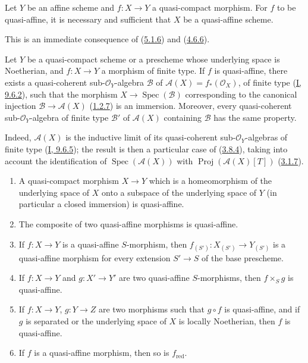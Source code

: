 \begin{corollary}[5.1.8]
\label{II.5.1.8}
Let $Y$ be an affine scheme and $f:X\to Y$ a quasi-compact morphism. For
$f$ to be quasi-affine, it is necessary and sufficient that $X$ be a
quasi-affine scheme.
\end{corollary}

This is an immediate consequence of (\hyperref[II.5.1.6]{5.1.6}) and
(\hyperref[II.4.6.6]{4.6.6}).

\begin{corollary}[5.1.9]
\label{II.5.1.9}
Let $Y$ be a quasi-compact scheme or a prescheme whose underlying space
is Noetherian, and $f:X\to Y$ a morphism of finite type. If $f$ is
quasi-affine, there exists a quasi-coherent sub-$\mathcal{O}_Y$-algebra
$\mathcal{B}$ of $\mathcal{A}(X)=f_*(\mathcal{O}_X)$, of finite type
(\hyperref[I.9.6.2]{I, 9.6.2}), such that the morphism
$X\to\operatorname{Spec}(\mathcal{B})$ corresponding to the canonical injection
$\mathcal{B}\to\mathcal{A}(X)$ (\hyperref[II.1.2.7]{1.2.7}) is an
immersion. Moreover, every quasi-coherent sub-$\mathcal{O}_Y$-algebra of
finite type $\mathcal{B}'$ of $\mathcal{A}(X)$ containing $\mathcal{B}$
has the same property.
\end{corollary}

Indeed, $\mathcal{A}(X)$ is the inductive limit of its quasi-coherent
sub-$\mathcal{O}_Y$-algebras of finite type
(\hyperref[I.9.6.5]{I, 9.6.5}); the result is then a particular case
of (\hyperref[II.3.8.4]{3.8.4}), taking into account the identification of
$\operatorname{Spec}(\mathcal{A}(X))$ with
$\operatorname{Proj}(\mathcal{A}(X)[T])$
(\hyperref[II.3.1.7]{3.1.7}).

\begin{proposition}[5.1.10]
\label{II.5.1.10}
\begin{enumerate}
  \item[\rm{(i)}] A quasi-compact morphism $X\to Y$ which is a
  homeomorphism of the underlying space of $X$ onto a subspace of the
  underlying space of $Y$ (in particular a closed immersion) is
  quasi-affine.
  \item[\rm{(ii)}] The composite of two quasi-affine morphisms is
  quasi-affine.
  \item[\rm{(iii)}] If $f:X\to Y$ is a quasi-affine $S$-morphism, then
  $f_{(S')}:X_{(S')}\to Y_{(S')}$ is a quasi-affine morphism for every
  extension $S'\to S$ of the base prescheme.
  \item[\rm{(iv)}] If $f:X\to Y$ and $g:X'\to Y'$ are two quasi-affine
  $S$-morphisms, then $f\times_S g$ is quasi-affine.
  \item[\rm{(v)}] If $f:X\to Y$, $g:Y\to Z$ are two morphisms such that
  $g\circ f$ is quasi-affine, and if $g$ is separated or the underlying
  space of $X$ is locally Noetherian, then $f$ is quasi-affine.
  \item[\rm{(vi)}] If $f$ is a quasi-affine morphism, then so is
  $f_{\mathrm{red}}$.
\end{enumerate}
\end{proposition}

